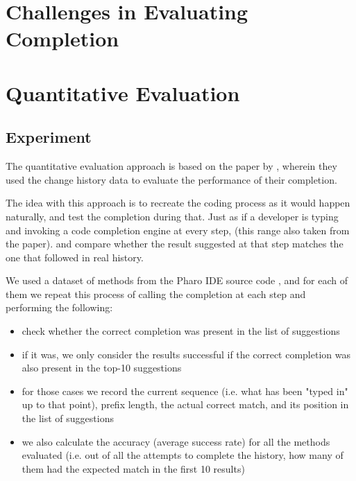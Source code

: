 \section{Challenges in Evaluating Completion}
\label{sec:Evaluation-Challenges}

\section{Quantitative Evaluation}
\label{sec:Evaluation-Quantitative}
\subsection{Experiment}
The quantitative evaluation approach  is based on the paper by \cite{Robb08a}, wherein they used the change history data to evaluate the performance of their completion.

The idea with this approach is to recreate the coding process as it would happen naturally, and test the completion during that. Just as if a developer is typing and invoking a code completion engine at every step,  (this range also taken from the \cite{Robb08a} paper).  and compare whether the result suggested at that step matches the one that followed in real history.

We used a dataset of methods from the Pharo IDE source code  , and for each of them we repeat this process of calling the completion at each step and performing the following:
\begin{itemize}
    \item check whether the correct completion was present in the list of suggestions
    \item if it was, we only consider the results successful if the correct completion was also present in the top-10 suggestions
    \item for those cases we record the current sequence (i.e. what has been "typed in" up to that point), prefix length, the actual correct match, and its position in the list of suggestions
    \item we also calculate the accuracy (average success rate) for all the methods evaluated (i.e. out of all the attempts to complete the history, how many of them had the expected match in the first 10 results)
\end{itemize}

